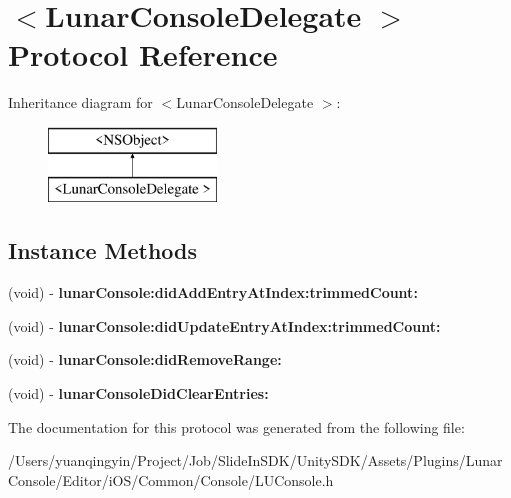 \hypertarget{protocol_lunar_console_delegate_01-p}{}\section{$<$Lunar\+Console\+Delegate $>$ Protocol Reference}
\label{protocol_lunar_console_delegate_01-p}
Inheritance diagram for $<$Lunar\+Console\+Delegate $>$\+:\begin{figure}[H]
\begin{center}
\leavevmode
\includegraphics[height=2.000000cm]{protocol_lunar_console_delegate_01-p}
\end{center}
\end{figure}
\subsection*{Instance Methods}
\begin{DoxyCompactItemize}
\item 
\mbox{\label{protocol_lunar_console_delegate_01-p_aa63a2bc8ec1061254c44dd3388ffd505}} 
(void) -\/ {\bfseries lunar\+Console\+:did\+Add\+Entry\+At\+Index\+:trimmed\+Count\+:}
\item 
\mbox{\label{protocol_lunar_console_delegate_01-p_a6c74661e79b75f2b67f983df3c83959b}} 
(void) -\/ {\bfseries lunar\+Console\+:did\+Update\+Entry\+At\+Index\+:trimmed\+Count\+:}
\item 
\mbox{\label{protocol_lunar_console_delegate_01-p_ae308ac0f55ee1e6eb639b031681c1a4d}} 
(void) -\/ {\bfseries lunar\+Console\+:did\+Remove\+Range\+:}
\item 
\mbox{\label{protocol_lunar_console_delegate_01-p_a8fe02276cca4428f677bcb9db87062cb}} 
(void) -\/ {\bfseries lunar\+Console\+Did\+Clear\+Entries\+:}
\end{DoxyCompactItemize}


The documentation for this protocol was generated from the following file\+:\begin{DoxyCompactItemize}
\item 
/\+Users/yuanqingyin/\+Project/\+Job/\+Slide\+In\+S\+D\+K/\+Unity\+S\+D\+K/\+Assets/\+Plugins/\+Lunar\+Console/\+Editor/i\+O\+S/\+Common/\+Console/L\+U\+Console.\+h\end{DoxyCompactItemize}
